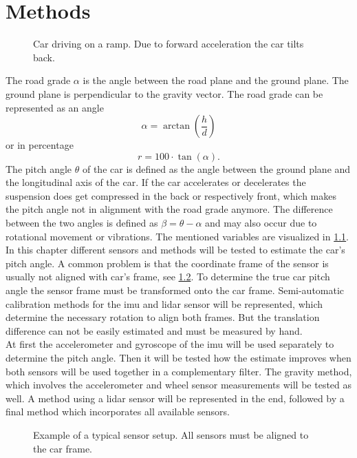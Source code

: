 \chapter{Methods}
\label{ch:Methods}
\begin{figure}[htpb]
	\centering
	
	\caption{Car driving on a ramp. Due to forward acceleration the car tilts back.}
	\label{fig:tikz_car_tilt}
\end{figure}
The road grade $\alpha$ is the angle between the road plane and the ground plane.
The ground plane is perpendicular to the gravity vector.
The road grade can be represented as an angle
\begin{equation}
	\alpha = \arctan(\frac{h}{d})
\end{equation}
or in percentage
\begin{equation}
	r = 100\cdot\tan(\alpha).
\end{equation}
The pitch angle $\theta$ of the car is defined as the angle between the ground plane and the longitudinal axis of the car.
If the car accelerates or decelerates the suspension does get compressed in the back or respectively front, which makes the pitch angle not in alignment with the road grade anymore.
The difference between the two angles is defined as $\beta = \theta - \alpha$ and may also occur due to rotational movement or vibrations.
The mentioned variables are visualized in \cref{fig:tikz_car_tilt}.\\
In this chapter different sensors and methods will be tested to estimate the car's pitch angle.
A common problem is that the coordinate frame of the sensor is usually not aligned with car's frame, see \cref{fig:tikz_car_frames}.
To determine the true car pitch angle the sensor frame must be transformed onto the car frame.
Semi-automatic calibration methods for the \gls{imu} and \gls{lidar} sensor will be represented, which determine the necessary rotation to align both frames.
But the translation difference can not be easily estimated and must be measured by hand.\\
At first the accelerometer and gyroscope of the \gls{imu} will be used separately to determine the pitch angle.
Then it will be tested how the estimate improves when both sensors will be used together in a complementary filter.
The gravity method, which involves the accelerometer and wheel sensor measurements will be tested as well.
A method using a \gls{lidar} sensor will be represented in the end, followed by a final method which incorporates all available sensors.
\begin{figure}[htpb]
	\centering
	
	\caption{Example of a typical sensor setup. All sensors must be aligned to the car frame.}
	\label{fig:tikz_car_frames}
\end{figure}



